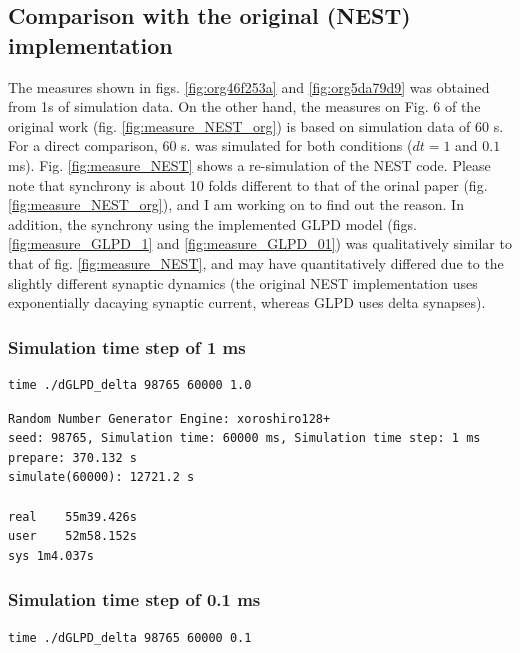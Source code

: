 \documentclass[11pt]{scrartcl}
\begin{document}
\subsection{Comparison with the original (NEST) implementation}
\label{sec:org3e4f162}

The measures shown in figs. \ref{fig:org46f253a} and \ref{fig:org5da79d9} was obtained from 1s of simulation data. On the other hand, the measures on Fig. 6 of the original work \cite{PotjansDiesmann2014} (fig. \ref{fig:measure_NEST_org}) is based on simulation data of 60 s. For a direct comparison, 60 s. was simulated for both conditions (\(dt=1\) and \(0.1\) ms). Fig. \ref{fig:measure_NEST} shows a re-simulation of the NEST code. Please note that synchrony is about 10 folds different to that of the orinal paper (fig. \ref{fig:measure_NEST_org}), and I am working on to find out the reason. In addition, the synchrony using the implemented GLPD model (figs. \ref{fig:measure_GLPD_1} and \ref{fig:measure_GLPD_01}) was qualitatively similar to that of fig. \ref{fig:measure_NEST}, and may have quantitatively differed due to the slightly different synaptic dynamics (the original NEST implementation uses exponentially dacaying synaptic current, whereas GLPD uses delta synapses).


\subsubsection{Simulation time step of 1 ms}
\label{sec:orge4e45b4}

\begin{verbatim}
time ./dGLPD_delta 98765 60000 1.0
\end{verbatim}

\begin{verbatim}
Random Number Generator Engine: xoroshiro128+
seed: 98765, Simulation time: 60000 ms, Simulation time step: 1 ms
prepare: 370.132 s
simulate(60000): 12721.2 s

real	55m39.426s
user	52m58.152s
sys	1m4.037s
\end{verbatim}


\subsubsection{Simulation time step of 0.1 ms}
\label{sec:org4c8c143}

\begin{verbatim}
time ./dGLPD_delta 98765 60000 0.1
\end{verbatim}
\end{document}
